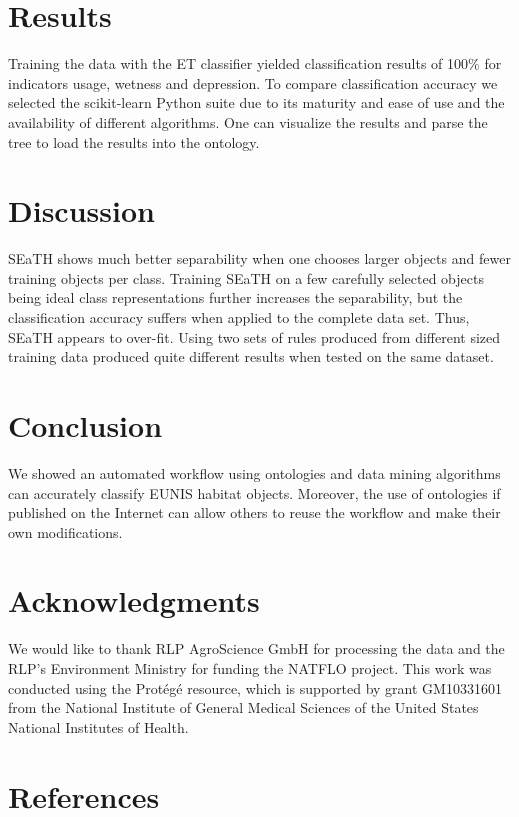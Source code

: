 \documentclass[authoryear, review,12pt,number]{elsarticle}
\begin{document}
\section{Results}
Training  the data with the ET classifier yielded classification results of
100\% for indicators usage, wetness and depression.
To compare classification accuracy we selected the scikit-learn Python suite
\citep{scikit-learn} due to its maturity and ease of use and the availability of
different algorithms. One can visualize the results and parse the tree to load
the results into the ontology.
\section{Discussion} SEaTH shows much better separability when one chooses
larger objects and fewer training objects per class. Training SEaTH on a few
carefully selected objects being ideal class representations further increases
the separability, but the classification accuracy suffers when applied to the
complete data set. Thus, SEaTH appears to over-fit. Using two sets of rules
produced from different sized training data produced quite different results
when tested on the same dataset.
\section{Conclusion} We showed an automated
workflow using ontologies and data mining algorithms can accurately classify
EUNIS habitat objects. Moreover, the use of ontologies if published on the
Internet can allow others to reuse the workflow and make their own
modifications. 
\section{Acknowledgments}
We would like to thank RLP AgroScience GmbH for processing the data and the
RLP's Environment Ministry for funding the  NATFLO project. This work was
conducted using the Prot\'eg\'e resource, which is supported by grant GM10331601
from the National Institute of General Medical Sciences of the United States
National
Institutes of Health.

\section{References}  
\end{document}
